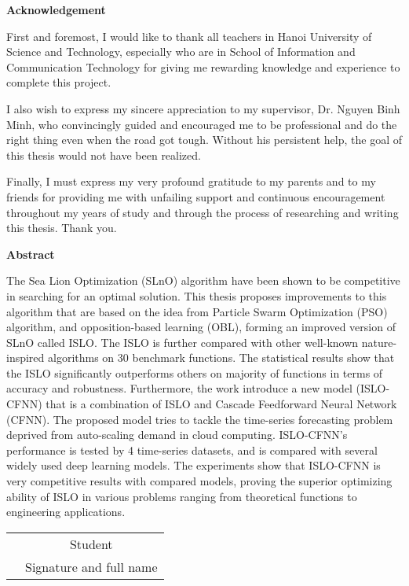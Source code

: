 \documentclass[../main.tex]{subfiles}
\begin{document}
\begin{center}
    \textbf{Acknowledgement}\\
\end{center}
First and foremost, I would like to thank all teachers in Hanoi University of Science and Technology, especially who are in School of Information and Communication Technology for giving me rewarding knowledge and experience to complete this project.

 I also wish to express my sincere appreciation to my supervisor, Dr. Nguyen Binh Minh, who convincingly guided and encouraged me to be professional and do the right thing even when the road got tough. Without his persistent help, the goal of this thesis would not have been realized.

Finally, I must express my very profound gratitude to my parents and to my friends for providing me with unfailing support and continuous encouragement throughout my years of study and through the process of researching and writing this thesis. Thank you. 

\vspace{0.5cm}
\begin{center}
    \textbf{Abstract}\\
\end{center}
The Sea Lion Optimization (SLnO) algorithm have been shown to be competitive in searching for an optimal solution. This thesis proposes improvements to this algorithm that are based on the idea from Particle Swarm Optimization (PSO) algorithm, and opposition-based learning (OBL), forming an improved version of SLnO called ISLO. The ISLO is further compared with other well-known nature-inspired algorithms on 30 benchmark functions. The statistical results show that the ISLO significantly outperforms others on majority of functions in terms of accuracy and robustness. Furthermore, the work introduce a new model (ISLO-CFNN) that is a combination of ISLO and Cascade Feedforward Neural Network (CFNN). The proposed model tries to tackle the time-series forecasting problem deprived from auto-scaling demand in cloud computing. ISLO-CFNN's performance is tested by 4 time-series datasets, and is compared with several widely used deep learning models. The experiments show that ISLO-CFNN is very competitive results with compared models, proving the superior optimizing ability of ISLO in various problems ranging from theoretical functions to engineering applications.
 


\vspace{0.5cm}
\begin{table}[H]
\centering
\begin{tabular}{p{5cm} c}
\multicolumn{1}{c}{\textbf{}} & Student \\
\textbf{}                     & \small{Signature and full name}
\end{tabular}
\end{table}
\end{document}
